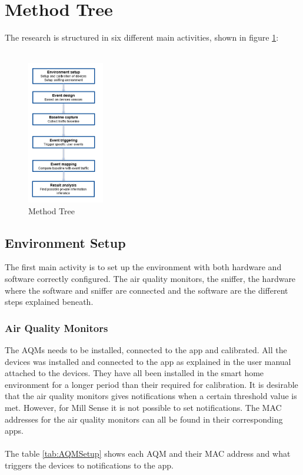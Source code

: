 \section{Method Tree}
The research is structured in six different main activities, shown in figure \ref{fig:MethodTree}:
\\\\
\begin{figure} [!ht]
    \centering
    \includegraphics[width=0.3\textwidth]{figures/MethodTree.png}
    \caption{Method Tree}
    \label{fig:MethodTree}
\end{figure}
\subsection{Environment Setup}
The first main activity is to set up the environment with both hardware and software correctly configured. The air quality monitors, the sniffer, the hardware where the software and sniffer are connected and the software are the different steps explained beneath. 
\subsubsection{Air Quality Monitors}
The AQMs needs to be installed, connected to the app and calibrated. All the devices was installed and connected to the app as explained in the user manual attached to the devices. They have all been installed in the smart home environment for a longer period than their required for calibration. It is desirable that the air quality monitors gives notifications when a certain threshold value is met. However, for Mill Sense it is not possible to set notifications. The MAC addresses for the air quality monitors can all be found in their corresponding apps. 
\\\\
The table \ref{tab:AQMSetup} shows each AQM and their MAC address and what triggers the devices to notifications to the app. 

